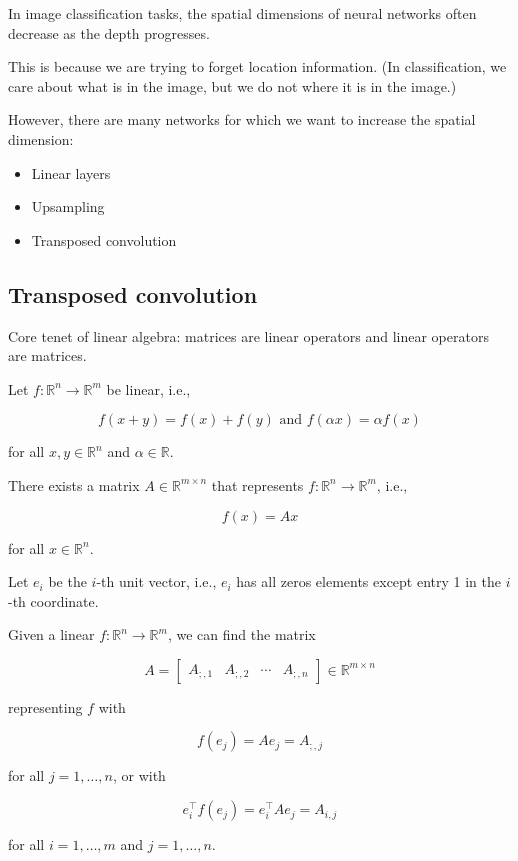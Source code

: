 \documentclass{report}
\begin{document}
\begin{concept}
    In image classification tasks, the spatial dimensions of neural networks often decrease as the depth progresses.

    This is because we are trying to forget location information. (In classification, we care about what is in the image, but we do not where it is in the image.)

    However, there are many networks for which we want to increase the spatial dimension:

    \begin{itemize}
        \item Linear layers
        \item Upsampling
        \item Transposed convolution
    \end{itemize}
\end{concept}

\subsection{Transposed convolution}

\begin{concept}
    Core tenet of linear algebra: matrices are linear operators and linear operators are matrices.

    Let $f: \mathbb{R}^{n} \rightarrow \mathbb{R}^{m}$ be linear, i.e.,

    $$
    f(x+y)=f(x)+f(y) \text { and } f(\alpha x)=\alpha f(x)
    $$

    for all $x, y \in \mathbb{R}^{n}$ and $\alpha \in \mathbb{R}$.

    There exists a matrix $A \in \mathbb{R}^{m \times n}$ that represents $f: \mathbb{R}^{n} \rightarrow \mathbb{R}^{m}$, i.e.,

    $$
    f(x)=A x
    $$

    for all $x \in \mathbb{R}^{n}$.

    Let $e_{i}$ be the $i$-th unit vector, i.e., $e_{i}$ has all zeros elements except entry 1 in the $i$-th coordinate.

    Given a linear $f: \mathbb{R}^{n} \rightarrow \mathbb{R}^{m}$, we can find the matrix

    $$
    A=\left[\begin{array}{llll}
    A_{;, 1} & A_{;, 2} & \cdots & A_{;, n}
    \end{array}\right] \in \mathbb{R}^{m \times n}
    $$

    representing $f$ with

    $$
    f\left(e_{j}\right)=A e_{j}=A_{;, j}
    $$

    for all $j=1, \ldots, n$, or with

    $$
    e_{i}^{\top} f\left(e_{j}\right)=e_{i}^{\top} A e_{j}=A_{i, j}
    $$

    for all $i=1, \ldots, m$ and $j=1, \ldots, n$.
\end{concept}
\end{document}
